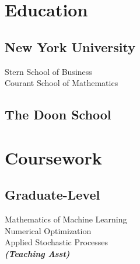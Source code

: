 \documentclass[]{deedy-resume-openfont}
\begin{document}
%
%
\lastupdated

%
%

%
%

\begin{minipage}[t]{0.28\textwidth} 


\section{Education} 

\subsection{New York University}
Stern School of Business \\
Courant School of Mathematics \\
\sectionsep

\subsection{The Doon School}
\sectionsep


\section{Coursework}
\subsection{Graduate-Level}
Mathematics of Machine Learning \\
Numerical Optimization \\
Applied Stochastic Processes \\
{\footnotesize \textit{\textbf{(Teaching Asst) }}} \\


\end{minipage}
\end{document}
